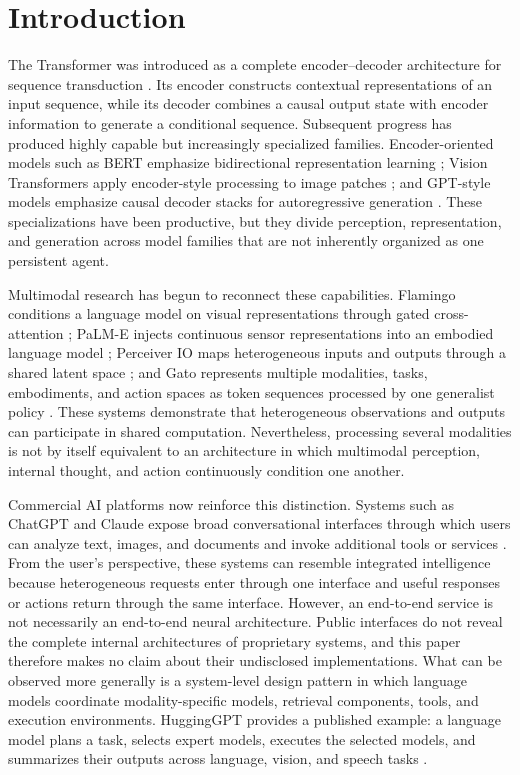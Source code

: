 \section{\textbf{Introduction}}

The Transformer was introduced as a complete encoder--decoder architecture for sequence transduction \cite{vaswani2017attention}. Its encoder constructs contextual representations of an input sequence, while its decoder combines a causal output state with encoder information to generate a conditional sequence. Subsequent progress has produced highly capable but increasingly specialized families. Encoder-oriented models such as BERT emphasize bidirectional representation learning \cite{devlin2019bert}; Vision Transformers apply encoder-style processing to image patches \cite{dosovitskiy2021image}; and GPT-style models emphasize causal decoder stacks for autoregressive generation \cite{brown2020language}. These specializations have been productive, but they divide perception, representation, and generation across model families that are not inherently organized as one persistent agent.

Multimodal research has begun to reconnect these capabilities. Flamingo conditions a language model on visual representations through gated cross-attention \cite{alayrac2022flamingo}; PaLM-E injects continuous sensor representations into an embodied language model \cite{driess2023palme}; Perceiver IO maps heterogeneous inputs and outputs through a shared latent space \cite{jaegle2022perceiver}; and Gato represents multiple modalities, tasks, embodiments, and action spaces as token sequences processed by one generalist policy \cite{reed2022generalist}. These systems demonstrate that heterogeneous observations and outputs can participate in shared computation. Nevertheless, processing several modalities is not by itself equivalent to an architecture in which multimodal perception, internal thought, and action continuously condition one another.

Commercial AI platforms now reinforce this distinction. Systems such as ChatGPT and Claude expose broad conversational interfaces through which users can analyze text, images, and documents and invoke additional tools or services \cite{openai2026chatgpt,anthropic2026claude}. From the user's perspective, these systems can resemble integrated intelligence because heterogeneous requests enter through one interface and useful responses or actions return through the same interface. However, an end-to-end service is not necessarily an end-to-end neural architecture. Public interfaces do not reveal the complete internal architectures of proprietary systems, and this paper therefore makes no claim about their undisclosed implementations. What can be observed more generally is a system-level design pattern in which language models coordinate modality-specific models, retrieval components, tools, and execution environments. HuggingGPT provides a published example: a language model plans a task, selects expert models, executes the selected models, and summarizes their outputs across language, vision, and speech tasks \cite{shen2023hugginggpt}.

